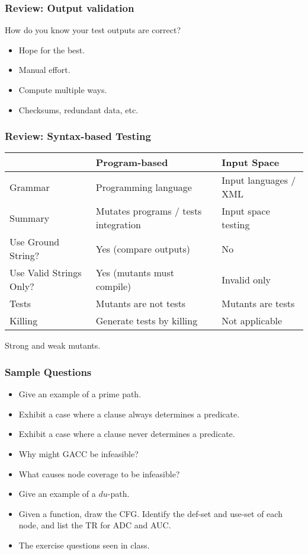 \documentclass{beamer}
\newenvironment{changemargin}[1]{%
  \begin{list}{}{%
    \setlength{\topsep}{0pt}%
    \setlength{\leftmargin}{#1}%
    \setlength{\rightmargin}{1em}
    \setlength{\listparindent}{\parindent}%
    \setlength{\itemindent}{\parindent}%
    \setlength{\parsep}{\parskip}%
  }%
  \item[]}{\end{list}}
\begin{document}
\begin{frame}
  \frametitle{Review: Output validation}
  \begin{changemargin}{2cm}
\Large
How do you know your test outputs are correct?
\begin{itemize}
\item Hope for the best.
\item Manual effort.
\item Compute multiple ways.
\item Checksums, redundant data, etc.
\end{itemize}
  \end{changemargin}
\end{frame}

\begin{frame}
  \frametitle{Review: Syntax-based Testing}

{\scriptsize
\begin{tabular}{l|ll}
& Program-based & Input Space \\ \hline
Grammar & Programming language & Input languages / XML \\
Summary & Mutates programs / tests integration & Input space testing \\
Use Ground String? & Yes (compare outputs) & No \\
Use Valid Strings Only? & Yes (mutants must compile) & Invalid only \\
Tests & Mutants are not tests & Mutants are tests \\
Killing & Generate tests by killing & Not applicable \\
\end{tabular}
}

  \begin{changemargin}{2cm}
Strong and weak mutants.
  \end{changemargin}
\end{frame}

\begin{frame}
  \frametitle{Sample Questions}

\begin{changemargin}{1cm}
\begin{itemize}
\item Give an example of a prime path.
\item Exhibit a case where a clause always determines
a predicate.
\item Exhibit a case where a clause never determines
a predicate.
\item Why might GACC be infeasible?
\item What causes node coverage to be infeasible?
\item Give an example of a $du$-path.
\item Given a function, draw the CFG. Identify the def-set and use-set of each node, 
and list the TR for ADC and AUC.
\item The exercise questions seen in class.
\end{itemize}
\end{changemargin}
\end{frame}
\end{document}
